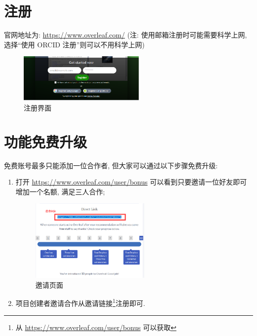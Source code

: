 \documentclass{booki}
\begin{document}
\newpage
\section{注册}\label{header-n2}

官网地址为: \url{https://www.overleaf.com/} (注: 使用邮箱注册时可能需要科学上网, 选择``使用 ORCID 注册''则可以不用科学上网)

\begin{figure}[H]
    \centering
    \includegraphics[width=0.55\textwidth]{Guidepics/20210415183938.png}
    \caption{注册界面}
\end{figure}

\section{功能免费升级}\label{header-n5}
免费账号最多只能添加一位合作者, 但大家可以通过以下步骤免费升级:
\begin{enumerate}
    \item 打开 \url{https://www.overleaf.com/user/bonus}
          可以看到只要邀请一位好友即可增加一个名额, 满足三人合作;
          \begin{figure}[H]
              \centering
              \includegraphics[width=0.55\textwidth]{Guidepics/20210415183943.png}
              \caption{邀请页面}
          \end{figure}
    \item 项目创建者邀请合作从邀请链接\footnote{从 \url{https://www.overleaf.com/user/bonus} 可以获取}注册即可.
\end{enumerate}
\end{document}
